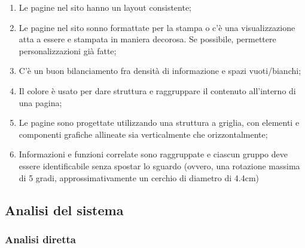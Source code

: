 \begin{enumerate}
    \item Le pagine nel sito hanno un layout consistente;
    \item Le pagine nel sito sonno formattate per la stampa o c'è una visualizzazione atta a essere e stampata in maniera decorosa. Se possibile, permettere personalizzazioni già fatte;
    \item C'è un buon bilanciamento fra densità di informazione e spazi vuoti/bianchi;
    \item Il colore è usato per dare struttura e raggruppare il contenuto all'interno di una pagina;
    \item Le pagine sono progettate utilizzando una struttura a griglia, con elementi e componenti grafiche allineate sia verticalmente che orizzontalmente;
    \item Informazioni e funzioni correlate sono raggruppate e ciascun gruppo deve essere identificabile senza spostar lo sguardo (ovvero, una rotazione massima di 5 gradi, approssimativamente un cerchio di diametro di 4.4cm)
\end{enumerate}

\subsection{Analisi del sistema}

\subsubsection{Analisi diretta}

